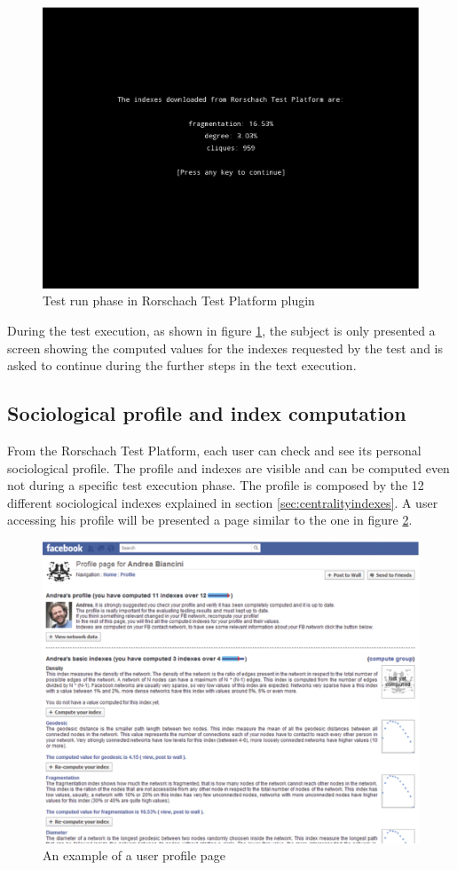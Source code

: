 \begin{figure}[h]
\centering
\includegraphics[width=12cm]{Fig4testrun.eps}
\caption{Test run phase in Rorschach Test Platform plugin}
\label{fig:testrun}
\end{figure}

During the test execution, as shown in figure \ref{fig:testrun}, the subject is only presented a screen showing the computed values for the indexes requested by the test
and is asked to continue during the further steps in the text execution.

\label{sec:sociologicalprofile}
\subsection{Sociological profile and index computation}
From the Rorschach Test Platform, each user can check and see its personal sociological profile.
The profile and indexes are visible and can be computed even not during a specific test execution phase.
The profile is composed by the 12 different sociological indexes explained in section \ref{sec:centralityindexes}.
A user accessing his profile will be presented a page similar to the one in figure \ref{fig:profile}.

\begin{figure}[h]
\centering
\includegraphics[width=12cm]{Fig5profile.eps}
\caption{An example of a user profile page}
\label{fig:profile}
\end{figure}

